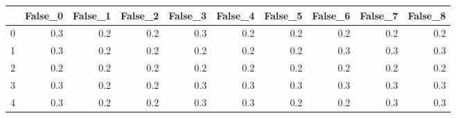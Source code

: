 \begin{tabular}{lrrrrrrrrr}
\toprule
{} &  False\_0 &  False\_1 &  False\_2 &  False\_3 &  False\_4 &  False\_5 &  False\_6 &  False\_7 &  False\_8 \\ \hline
\midrule
0 &      0.3 &      0.2 &      0.2 &      0.3 &      0.2 &      0.2 &      0.2 &      0.2 &      0.2 \\ \hline
1 &      0.3 &      0.2 &      0.2 &      0.2 &      0.2 &      0.2 &      0.3 &      0.3 &      0.3 \\ \hline
2 &      0.2 &      0.2 &      0.2 &      0.2 &      0.2 &      0.2 &      0.2 &      0.2 &      0.2 \\ \hline
3 &      0.3 &      0.2 &      0.2 &      0.3 &      0.3 &      0.3 &      0.3 &      0.3 &      0.3 \\ \hline
4 &      0.3 &      0.2 &      0.2 &      0.3 &      0.3 &      0.2 &      0.2 &      0.3 &      0.3 \\ \hline
\bottomrule
\end{tabular}
